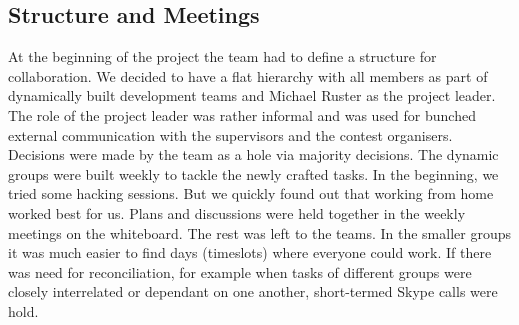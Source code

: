 \subsection{Structure and Meetings}
At the beginning of the project the team had to define a structure for collaboration. We decided to have a flat hierarchy with all members as part of dynamically built development teams and Michael Ruster as the project leader. The role of the project leader was rather informal and was used for bunched external communication with the supervisors and the contest organisers. Decisions were made by the team as a hole via majority decisions. The dynamic groups were built weekly to tackle the newly crafted tasks. In the beginning, we tried some hacking sessions. But we quickly found out that working from home worked best for us. Plans and discussions were held together in the weekly meetings on the whiteboard. The rest was left to the teams. In the smaller groups it was much easier to find days (timeslots) where everyone could work. If there was need for reconciliation, for example when tasks of different groups were closely interrelated or dependant on one another, short-termed Skype calls were hold. 


